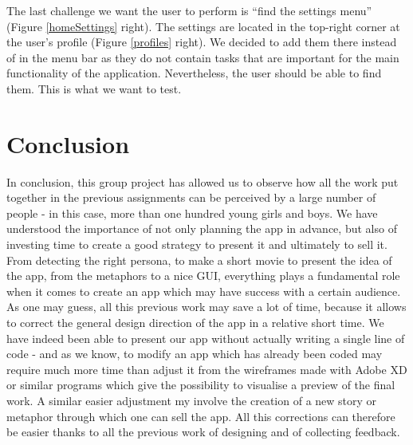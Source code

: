 \documentclass[12pt]{scrartcl}
\begin{document}
		The last challenge we want the user to perform is “find the settings menu” (Figure \ref{homeSettings} right). The settings are located in the top-right corner at the user’s profile (Figure \ref{profiles} right). We decided to add them there instead of in the menu bar as they do not contain tasks that are important for the main functionality of the application. Nevertheless, the user should be able to find them. This is what we want to test.\\

			
\section{Conclusion}

	
	In conclusion, this group project has allowed us to observe how all the work put together in the previous assignments can be perceived by a large number of people - in this case, more than one hundred young girls and boys. We have understood the importance of not only planning the app in advance, but also of investing time to create a good strategy to present it and ultimately to sell it. From detecting the right persona, to make a short movie to present the idea of the app, from the metaphors to a nice GUI, everything plays a fundamental role when it comes to create an app which may have success with a certain audience. As one may guess, all this previous work may save a lot of time, because it allows to correct the general design direction of the app in a relative short time. We have indeed been able to present our app without actually writing a single line of code - and as we know, to modify an app which has already been coded may require much more time than adjust it from the wireframes made with Adobe XD or similar programs which give the possibility to visualise a preview of the final work. A similar easier adjustment my involve the creation of a new story or metaphor through which one can sell the app. All this corrections can therefore be easier thanks to all the previous work of designing and of collecting feedback.\\
	
\end{document}
